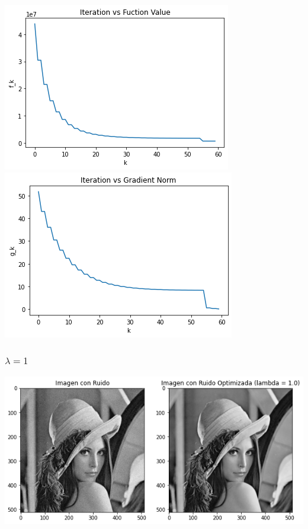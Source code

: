 \documentclass[11pt,letterpaper]{article}
\theoremstyle{definition}
\theoremstyle{definition}
\theoremstyle{definition}
\begin{document}
\begin{center}
	\includegraphics[width=0.6\linewidth]{graficas/pr/funcion_0}
	\includegraphics[width=0.6\linewidth]{graficas/pr/gradiente_0}
\end{center}

\subsubsection{$ \lambda = 1 $}
\begin{center}
	\includegraphics[width=0.7\linewidth]{graficas/pr/optimizada_1}
\end{center}
\end{document}
